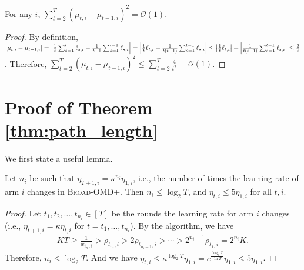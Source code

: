 \begin{lemma}
\label{lemma:second_Q_term}
For any $i$, $\sum_{t=2}^T (\mu_{t,i}-\mu_{t-1,i})^2=\mathcal{O}(1)$. 
\end{lemma}
\begin{proof}
By definition, \sloppy$\left\lvert {\mu_{t,i}-\mu_{t-1,i}} \right\rvert=\left\lvert {\frac{1}{t}\sum_{s=1}^t \ell_{s,i}-\frac{1}{t-1}\sum_{s=1}^{t-1} \ell_{s,i}} \right\rvert=\left\lvert {\frac{1}{t}\ell_{t,i}-\frac{1}{t(t-1)}\sum_{s=1}^{t-1}\ell_{s,i}} \right\rvert\leq \left\lvert {\frac{1}{t}\ell_{t,i}} \right\rvert+\left\lvert {\frac{1}{t(t-1)}\sum_{s=1}^{t-1}\ell_{s,i}} \right\rvert\leq \frac{2}{t}$. Therefore, $\sum_{t=2}^T (\mu_{t,i}-\mu_{t-1,i})^2\leq \sum_{t=2}^T \frac{4}{t^2}=\mathcal{O}(1)$. 
\end{proof}

\section{Proof of Theorem \ref{thm:path_length}}
We first state a useful lemma.
\begin{lemma}
\label{lemma:bound_ni}
Let $n_i$ be such that $\eta_{T+1,i}=\kappa^{n_i}\eta_{1,i}$, i.e., the number of times the learning rate of arm $i$ changes in \textsc{Broad-OMD+}. Then $n_i\leq \log_2 T$, and $\eta_{t,i}\leq 5\eta_{1,i}$ for all $t,i$.  
\end{lemma}
\begin{proof}
Let $t_1, t_2, \ldots, t_{n_i}\in [T]$ be the rounds the learning rate for arm $i$ changes (i.e., $\eta_{t+1,i}=\kappa \eta_{t,i}$ for $t=t_1, \ldots, t_{n_i}$). 
By the algorithm, we have 
\begin{align*}
KT\geq \frac{1}{\bar{w}_{t_{n_i},i}}>\rho_{t_{n_i},i}>2\rho_{t_{n_i-1},i}>\cdots>2^{n_i-1}\rho_{t_1,i}=2^{n_i}K. 
\end{align*}
Therefore, $n_i\leq \log_2 T$. And we have $\eta_{t,i}\leq \kappa^{\log_2 T}\eta_{1,i}=e^{\frac{\log_2 T}{\ln T}}\eta_{1,i}\leq 5\eta_{1,i}$.
\end{proof}




